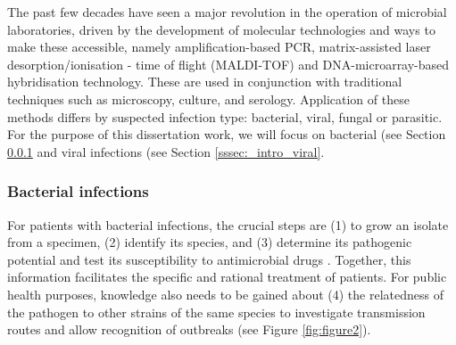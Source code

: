 The past few decades have seen a major revolution in the operation of microbial laboratories, driven by the development of molecular technologies and ways to make these accessible, namely amplification-based \ac{PCR}, matrix-assisted laser desorption/ionisation - time of flight (MALDI-TOF) and DNA-microarray-based hybridisation technology. 
These are used in conjunction with traditional techniques such as microscopy, culture, and serology.
Application of these methods differs by suspected infection type: bacterial, viral, fungal or parasitic. 
For the purpose of this dissertation work, we will focus on bacterial (see Section \ref{sssec:_intro_bacterial} and viral infections (see Section \ref{sssec:_intro_viral}.

\subsubsection{Bacterial infections} \label{sssec:_intro_bacterial}

For patients with bacterial infections, the crucial steps are (1) to grow an isolate from a specimen, (2) identify its species, and (3) determine its pathogenic potential and test its susceptibility to antimicrobial drugs  \citep{didelot_transforming_2012}. 
Together, this information facilitates the specific and rational treatment of patients. 
For public health purposes, knowledge also needs to be gained about (4) the relatedness of the pathogen to other strains of the same species to investigate transmission routes and allow recognition of outbreaks \citep{foxman_choosing_2005} (see Figure \ref{fig:figure2}). 

